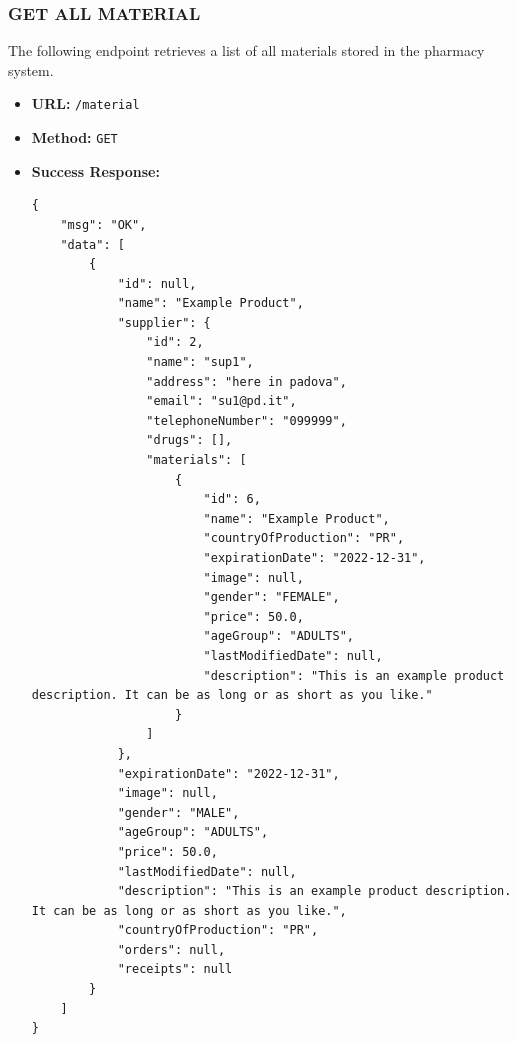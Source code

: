 \subsubsection*{GET ALL MATERIAL}
The following endpoint retrieves a list of all materials stored in the pharmacy system. 
\begin{itemize}
    \item \textbf{URL:}
    \newline \hspace*{1cm} \texttt{/material}  
    \item \textbf{Method:}
    \newline \hspace*{1cm}\texttt{GET}
    \item \textbf{Success Response:}
\begin{lstlisting}[breaklines]
{
    "msg": "OK",
    "data": [
        {
            "id": null,
            "name": "Example Product",
            "supplier": {
                "id": 2,
                "name": "sup1",
                "address": "here in padova",
                "email": "su1@pd.it",
                "telephoneNumber": "099999",
                "drugs": [],
                "materials": [
                    {
                        "id": 6,
                        "name": "Example Product",
                        "countryOfProduction": "PR",
                        "expirationDate": "2022-12-31",
                        "image": null,
                        "gender": "FEMALE",
                        "price": 50.0,
                        "ageGroup": "ADULTS",
                        "lastModifiedDate": null,
                        "description": "This is an example product description. It can be as long or as short as you like."
                    }
                ]
            },
            "expirationDate": "2022-12-31",
            "image": null,
            "gender": "MALE",
            "ageGroup": "ADULTS",
            "price": 50.0,
            "lastModifiedDate": null,
            "description": "This is an example product description. It can be as long or as short as you like.",
            "countryOfProduction": "PR",
            "orders": null,
            "receipts": null
        }
    ]
}

\end{lstlisting}
\end{itemize}

